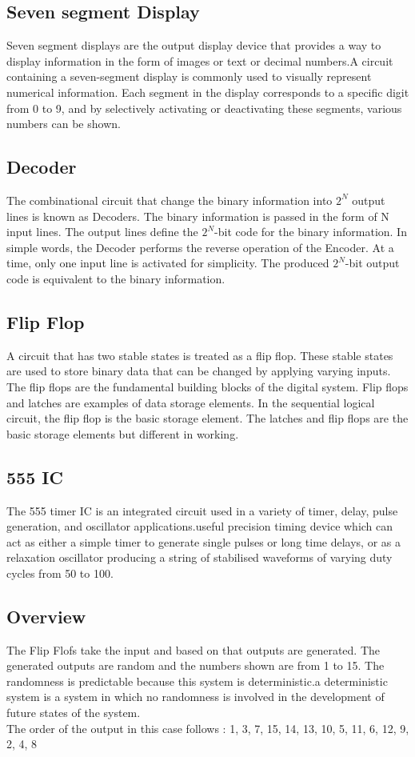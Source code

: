 \documentclass{article}
\begin{document}
\subsection{Seven segment Display}
Seven segment displays are the output display device that provides a way to display information in the form of images or text or decimal numbers.A circuit containing a seven-segment display is commonly used to visually represent numerical information. Each segment in the display corresponds to a specific digit from 0 to 9, and by selectively activating or deactivating these segments, various numbers can be shown.

\subsection{Decoder}
The combinational circuit that change the binary information into $2^N$ output lines is known as Decoders. The binary information is passed in the form of N input lines. The output lines define the $2^N$-bit code for the binary information. In simple words, the Decoder performs the reverse operation of the Encoder. At a time, only one input line is activated for simplicity. The produced $2^N$-bit output code is equivalent to the binary information.

\subsection{Flip Flop}
A circuit that has two stable states is treated as a flip flop. These stable states are used to store binary data that can be changed by applying varying inputs. The flip flops are the fundamental building blocks of the digital system. Flip flops and latches are examples of data storage elements. In the sequential logical circuit, the flip flop is the basic storage element. The latches and flip flops are the basic storage elements but different in working.

\subsection{555 IC}
The 555 timer IC is an integrated circuit  used in a variety of timer, delay, pulse generation, and oscillator applications.useful precision timing device which can act as either a simple timer to generate single pulses or long time delays, or as a relaxation oscillator producing a string of stabilised waveforms of varying duty cycles from 50 to 100.

\subsection{Overview}
The Flip Flofs take the input and based on that outputs are generated. The generated outputs are random and the numbers shown are from 1 to 15. The randomness is predictable because this system is deterministic.a deterministic system is a system in which no randomness is involved in the development of future states of the system.\\
The order of the output in this case follows : 1, 3, 7, 15, 14, 13, 10, 5, 11, 6, 12, 9, 2, 4, 8
\end{document}
